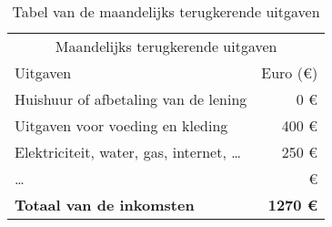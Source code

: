\begin{table}[!htbp]
	\centering
	\begin{tabular}{@{}lr@{}}
		\toprule
		       \multicolumn{2}{c}{Maandelijks terugkerende uitgaven}         \\
		\cmidrule(r){1-2}
		Uitgaven               &          Euro (\euro{}) \\ \midrule
		Huishuur of afbetaling van de lening       &            0 \euro{} \\
		Uitgaven voor voeding en kleding           &               400 \euro{} \\
		Elektriciteit, water, gas, internet, \dots &             250 \euro{} \\
		\dots                                      &                \euro{} \\ \toprule
		\textbf{Totaal van de inkomsten}           & \textbf{1270 \euro{}} \\ \bottomrule
	\end{tabular}
	\caption{Tabel van de maandelijks terugkerende uitgaven}
	\label{tab:tabelmaandelijksterugkerendeuitgaven}
\end{table}




